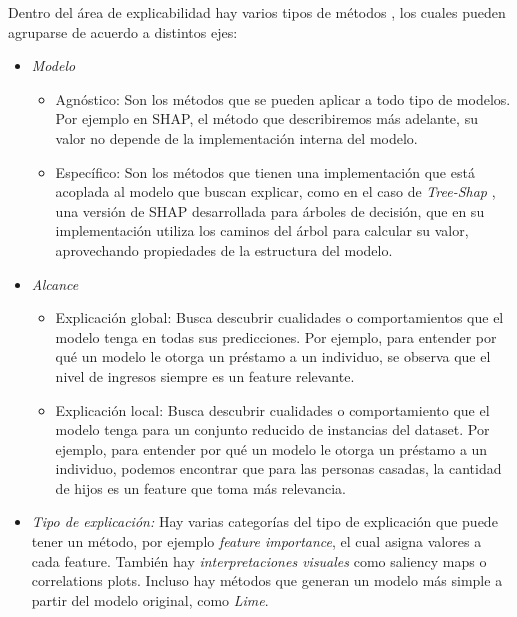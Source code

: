Dentro del área de explicabilidad hay varios tipos de métodos \cite{interpretabilityBook}, los cuales pueden agruparse de acuerdo a distintos ejes:
\begin{itemize}
    \item \textit{Modelo}
        \begin{itemize}
            \item Agnóstico: Son los métodos que se pueden aplicar a todo tipo de modelos. Por ejemplo en SHAP, el método que describiremos más adelante, su valor no depende de la implementación interna del modelo. %
            \item Específico: Son los métodos que tienen una implementación que está acoplada al modelo que buscan explicar, como en el caso de \textit{Tree-Shap} , una versión de SHAP desarrollada para árboles de decisión, que en su implementación utiliza los caminos del árbol para calcular su valor, aprovechando propiedades de la estructura del modelo.
        \end{itemize}
    \item \textit{Alcance}
        \begin{itemize}
            \item Explicación global: Busca descubrir cualidades o comportamientos que el modelo tenga en todas sus predicciones. Por ejemplo, para entender por qué un modelo le otorga un préstamo a un individuo, se observa que el nivel de ingresos siempre es un feature relevante. %
            \item Explicación local: Busca descubrir cualidades o comportamiento que el modelo tenga para un conjunto reducido de instancias del dataset. Por ejemplo, para entender por qué un modelo le otorga un préstamo a un individuo, podemos encontrar que para las personas casadas, la cantidad de hijos es un feature que toma más relevancia.  %
        \end{itemize}
    \item \textit{Tipo de explicación:} Hay varias categorías del tipo de explicación que puede tener un método, por ejemplo \textit{feature importance}, el cual asigna valores a cada feature. También hay \textit{interpretaciones visuales} como saliency maps o correlations plots. Incluso hay métodos que generan un modelo más simple a partir del modelo original, como \textit{Lime}. 


\end{itemize}
